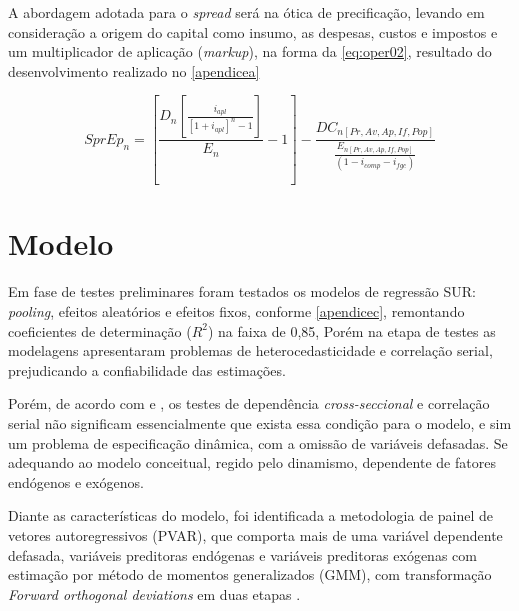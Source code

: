 \documentclass[
  12pt,
  12pt,
  openright,
  oneside,
  a4paper,
  chapter=TITLE,
  section=TITLE,
  subsection=TITLE,
  subsubsection=TITLE,
  english,
  portugues,
  sumario=tradicional]{abntex2}
\begin{document}
A abordagem adotada para o \emph{spread} será na ótica de precificação, levando em consideração a origem do capital como insumo, as despesas, custos e impostos e um multiplicador de aplicação (\emph{markup}), na forma da \autoref{eq:oper02}, resultado do desenvolvimento realizado no \autoref{apendicea}

\begin{equation}\label{eq:amor00}
SprEp_{n} =  [\frac{D_{n}[\frac{   i_{apl}  }{  [1 + i_{apl}]^n -1  }]}{E_{n}} -1] - \frac{DC_{n[Pr,Av,Ap,If,Pop]}}{\frac{E_{n[Pr,Av,Ap,If,Pop]}}{(1 - i_{comp} - i_{fgc})}}
\end{equation}

\section{Modelo}

Em fase de testes preliminares foram testados os modelos de regressão SUR: \emph{pooling}, efeitos aleatórios e efeitos fixos, conforme \autoref{apendicec}, remontando coeficientes de determinação (\(R^2\)) na faixa de 0,85, Porém na etapa de testes as modelagens apresentaram problemas de heterocedasticidade e correlação serial, prejudicando a confiabilidade das estimações.

Porém, de acordo com \textcite{sargan:1964} e \textcite{hendry:1978}, os testes de dependência \emph{cross-seccional} e correlação serial não significam essencialmente que exista essa condição para o modelo, e sim um problema de especificação dinâmica, com a omissão de variáveis defasadas. Se adequando ao modelo conceitual, regido pelo dinamismo, dependente de fatores endógenos e exógenos.

Diante as características do modelo, foi identificada a metodologia de painel de vetores autoregressivos (PVAR), que comporta mais de uma variável dependente defasada, variáveis preditoras endógenas e variáveis preditoras exógenas com estimação por método de momentos generalizados (GMM), com transformação \emph{Forward orthogonal deviations} em duas etapas \cite{sigmund:2008}.
\end{document}
